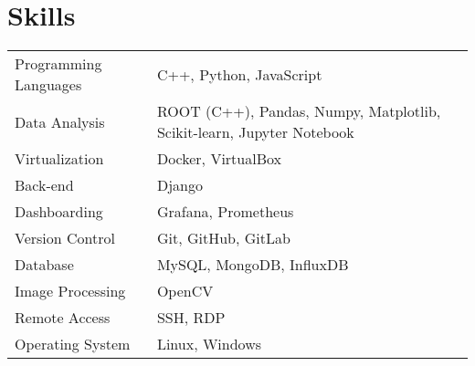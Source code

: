 \documentclass[a4paper,12pt]{article}
\begin{document}
\section{Skills}
\begin{tabularx}{\linewidth}{@{}l X@{}}
Programming Languages &  \normalsize{C++, Python, JavaScript}\\
Data Analysis & \normalsize{ROOT (C++), Pandas, Numpy, Matplotlib, Scikit-learn, Jupyter Notebook}\\
Virtualization & \normalsize{Docker, VirtualBox}\\
Back-end & \normalsize{Django}\\
Dashboarding & \normalsize{Grafana, Prometheus}\\
Version Control & \normalsize{Git, GitHub, GitLab}\\
Database & \normalsize{MySQL, MongoDB, InfluxDB}\\
Image Processing & \normalsize{OpenCV}\\
Remote Access & \normalsize{SSH, RDP}\\
Operating System & \normalsize{Linux, Windows}\\
\end{tabularx}

\end{document}
